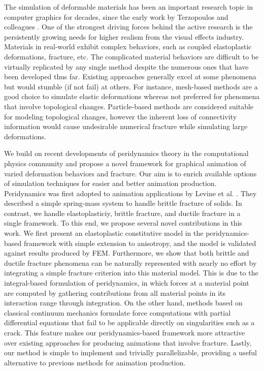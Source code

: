 The simulation of deformable materials has been an important research topic in computer graphics for decades, since the early work by Terzopoulos and colleagues \cite{Terzopoulos:1987:EDM:37402.37427}. One of the strongest driving forces behind the active research is the persistently growing needs for higher realism from the visual effects industry. Materials in real-world exhibit complex behaviors, such as coupled elastoplastic deformations, fracture, etc. The complicated material behaviors are difficult to be virtually replicated by any single method despite the numerous ones that have been developed thus far. Existing approaches generally excel at some phenomena but would stumble (if not fail) at others. For instance, mesh-based methods \cite{Muller:2004:IVM:1006058.1006087,Irving:2004:IFE:1028523.1028541,Teran:2005:RQF:1073368.1073394,Sifakis:2012:FSD:2343483.2343501} are a good choice to simulate elastic deformations whereas not preferred for phenomena that involve topological changes. Particle-based methods \cite{Muller:2003:PFS:846276.846298,Pauly:2005:MAF:1073204.1073296,Stomakhin:2013:MPM:2461912.2461948} are considered suitable for modeling topological changes, however the inherent loss of connectivity information would cause undesirable numerical fracture \cite{Liu:2011:AKM:2065362.2066108, Zhu:2016MPM} while simulating large deformations.

We build on recent developments of peridynamics theory in the computational physics community \cite{Silling2000,silling2007peridynamic,mitchell2011nonlocal, emmrich2013peridynamics,madenci2014peridynamic} and propose a novel framework for graphical animation of varied deformation behaviors and fracture. Our aim is to enrich available options of simulation techniques for easier and better animation production. Peridynamics was first adopted to animation applications by Levine et al. \cite{Levine:2015:PPS:2849517.2849526}. They described a simple spring-mass system to handle brittle fracture of solids. In contrast, we handle elastoplasticiy, brittle fracture, and ductile fracture in a single framework. To this end, we propose several novel contributions in this work. We first present an elastoplastic constitutive model in the peridynamics-based framework with simple extension to anisotropy, and the model is validated against results produced by FEM. Furthermore, we show that both brittle and ductile fracture phenomena can be naturally represented with nearly no effort by integrating a simple fracture criterion into this material model. This is due to the integral-based formulation of peridynamics, in which forces at a material point are computed by gathering contributions from all material points in its interaction range through integration. On the other hand, methods based on classical continuum mechanics formulate force computations with partial differential equations that fail to be applicable directly on singularities such as a crack. This feature makes our peridynamics-based framework more attractive over existing approaches for producing animations that involve fracture. Lastly, our method is simple to implement and trivially parallelizable, providing a useful alternative to previous methods for animation production.

